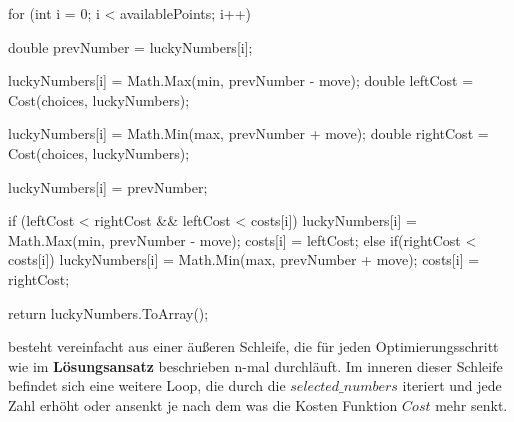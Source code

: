 \documentclass{article}
\begin{document}
\begin{flushleft}
\begin{Csharp}
{{{            for (int i = 0; i < availablePoints; i++)
            {
                double prevNumber = luckyNumbers[i];

                luckyNumbers[i] = Math.Max(min, prevNumber - move);
                double leftCost = Cost(choices, luckyNumbers);

                luckyNumbers[i] = Math.Min(max, prevNumber + move);
                double rightCost = Cost(choices, luckyNumbers);

                luckyNumbers[i] = prevNumber;

                if (leftCost < rightCost && leftCost < costs[i])
                {
                    luckyNumbers[i] = Math.Max(min, prevNumber - move);
                    costs[i] = leftCost;
                }
                else if(rightCost < costs[i])
                {
                    luckyNumbers[i] = Math.Min(max, prevNumber + move);
                    costs[i] = rightCost;
                }
            }
        }
    }

    return luckyNumbers.ToArray();
}
\end{Csharp}
besteht vereinfacht aus einer äußeren Schleife, die für jeden Optimierungsschritt wie im \textbf{Lösungsansatz} beschrieben n-mal durchläuft. Im inneren dieser Schleife befindet sich eine weitere Loop, die durch die $selected\_numbers$ iteriert und jede Zahl erhöht oder ansenkt je nach dem was die Kosten Funktion $Cost$ mehr senkt. 

\end{flushleft}
\end{document}
